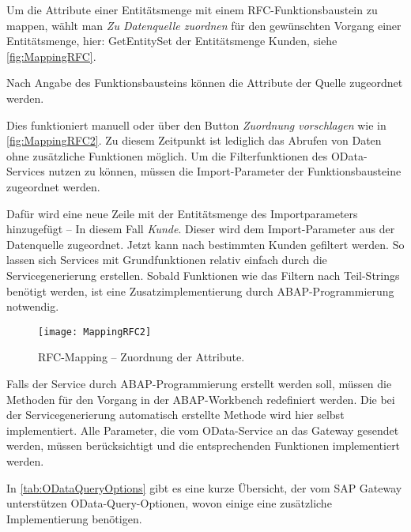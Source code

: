 
Um die Attribute einer En\-ti\-täts\-men\-ge mit einem RFC-Funk\-tions\-bau\-stein zu mappen, wählt man \emph{Zu Da\-ten\-quel\-le zuordnen} für den gewünschten Vorgang einer En\-ti\-täts\-men\-ge, hier: GetEntitySet der En\-ti\-täts\-men\-ge Kunden, siehe \autoref{fig:MappingRFC}.

Nach Angabe des Funk\-tions\-bau\-steins können die Attribute der Quelle zugeordnet werden. 

Dies funktioniert manuell oder über den Button \emph{Zuordnung vorschlagen} wie in \autoref{fig:MappingRFC2}. Zu diesem Zeitpunkt ist lediglich das Abrufen von Daten ohne zusätzliche Funktionen möglich. Um die Filterfunktionen des OData-Services nutzen zu können, müssen die Import-Parameter der Funktionsbausteine zugeordnet werden.

Dafür wird eine neue Zeile mit der Entitätsmenge des Importparameters hinzugefügt -- In diesem Fall \textit{Kunde}. Dieser wird dem Import-Parameter aus der Datenquelle zugeordnet. Jetzt kann nach bestimmten Kunden gefiltert werden.
So lassen sich Services mit Grundfunktionen relativ einfach durch die Servicegenerierung erstellen. Sobald Funktionen wie das Filtern nach Teil-Strings benötigt werden, ist eine Zusatzimplementierung durch ABAP-Programmierung notwendig.



\begin{figure}[h]
	\centering
	\texttt{[image: MappingRFC2]} 
	\caption[RFC-Mapping -- Zuordnung der Attribute]{RFC-Mapping -- Zuordnung der Attribute.}
	\label{fig:MappingRFC2}
\end{figure}

Falls der Service durch ABAP-Programmierung erstellt werden soll, müssen die Methoden für den Vorgang in der ABAP-Workbench redefiniert werden. Die bei der Servicegenerierung automatisch erstellte Methode wird hier selbst implementiert. Alle Parameter, die vom OData-Service an das Gateway gesendet werden, müssen berücksichtigt und die entsprechenden Funktionen implementiert werden.

In \autoref{tab:ODataQueryOptions} gibt es eine kurze Übersicht, der vom SAP Gateway unterstützen OData-Query-Optionen, wovon einige eine zusätzliche Implementierung benötigen.

